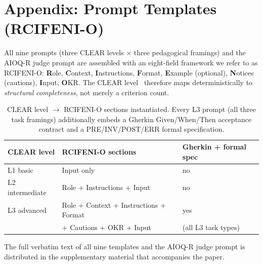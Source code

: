 
\section*{Appendix: Prompt Templates (RCIFENI-O)}\label{sec:appendix-a}

All nine prompts (three CLEAR levels $\times$ three pedagogical
framings) and the AIOQ-R judge prompt are assembled with an eight-field
framework we refer to as RCIFENI-O: \textbf{R}ole, \textbf{C}ontext,
\textbf{I}nstructions, \textbf{F}ormat, \textbf{E}xample (optional),
\textbf{N}otices (cautions), \textbf{I}nput, \textbf{O}KR. The CLEAR
level~\cite{Lo2023} therefore maps deterministically to
\emph{structural completeness}, not merely a criterion count.

\begin{table}[htbp]
  \centering
  \caption{CLEAR level $\to$ RCIFENI-O sections instantiated. Every L3
           prompt (all three task framings) additionally embeds a Gherkin
           Given/When/Then acceptance contract and a PRE/INV/POST/ERR
           formal specification.}
  \label{tab:clear-rcifeni}
  \begin{tabular}{lll}
    \toprule
    CLEAR level & RCIFENI-O sections                          & Gherkin + formal spec \\
    \midrule
    L1 basic        & Input only                              & no  \\
    L2 intermediate & Role + Instructions + Input             & no  \\
    L3 advanced     & Role + Context + Instructions + Format  & yes \\
                    & \quad + Cautions + OKR + Input          & (all L3 task types) \\
    \bottomrule
  \end{tabular}
\end{table}

The full verbatim text of all nine templates and the AIOQ-R judge prompt
is distributed in the supplementary material that accompanies the paper.
